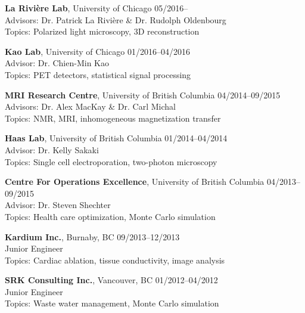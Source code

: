 \documentclass[12pt,letterpaper]{article}
\begin{document}
\begin{etaremune}[labelsep=0.035\textwidth]
\item
  {\textbf{La Rivi\`ere Lab}, University of Chicago} \hfill 05/2016--\\
  Advisors: Dr. Patrick La Rivi\`ere \& Dr. Rudolph Oldenbourg\\
  Topics: Polarized light microscopy, 3D reconstruction
\item
  {\textbf{Kao Lab}, University of Chicago} \hfill 01/2016--04/2016\\
  Advisor: Dr. Chien-Min Kao\\
  Topics: PET detectors, statistical signal processing
\item
  {\textbf{MRI Research Centre}, University of British Columbia} \hfill 04/2014--09/2015\\
  Advisors: Dr. Alex MacKay \& Dr. Carl Michal\\
  Topics: NMR, MRI, inhomogeneous magnetization transfer
\item                
  {\textbf{Haas Lab}, University of British Columbia} \hfill 01/2014--04/2014\\
  Advisor: Dr. Kelly Sakaki\\
  Topics: Single cell electroporation, two-photon microscopy
\item
  {\textbf{Centre For Operations Excellence}, University of British Columbia} \hfill 04/2013--09/2015\\
  Advisor: Dr. Steven Shechter\\
  Topics: Health care optimization, Monte Carlo simulation
\end{etaremune}

\begin{etaremune}[labelsep=0.035\textwidth]
\item
  \textbf{Kardium Inc.}, Burnaby, BC \hfill 09/2013--12/2013\\
  Junior Engineer\\
  Topics: Cardiac ablation, tissue conductivity, image analysis
\item
  \textbf{SRK Consulting Inc.}, Vancouver, BC \hfill 01/2012--04/2012\\
  Junior Engineer\\
  Topics: Waste water management, Monte Carlo simulation
\end{etaremune}
\end{document}
